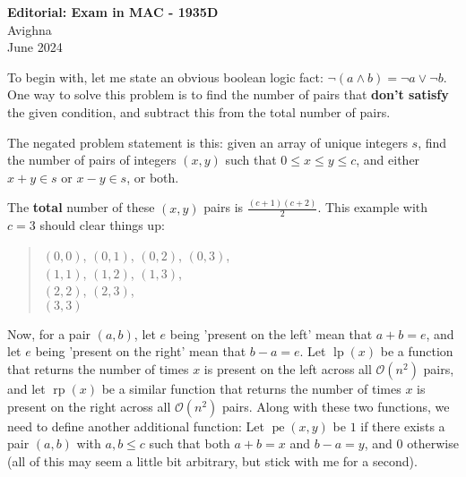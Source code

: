 \documentclass{article}
\begin{document}
\begin{center}
  \large{\textbf{Editorial: Exam in MAC - 1935D}}\\
  \vspace{0.2em}
  \large{Avighna}\\
  \vspace{0.2em}
  \large{June 2024}
\end{center}

To begin with, let me state an obvious boolean logic fact: $\neg (a \land b) = \neg a \lor \neg b$. One way to solve this problem is to find the number of pairs that \textbf{don't satisfy} the given condition, and subtract this from the total number of pairs.

The negated problem statement is this: given an array of unique integers $s$, find the number of pairs of integers $(x, y)$ such that $0 \le x \le y \le c$, and either $x+y \in s$ or $x-y \in s$, or both.

The \textbf{total} number of these $(x,y)$ pairs is $\frac{(c+1)(c+2)}{2}$. This example with $c=3$ should clear things up:\\
\begin{quote}
$(0, 0)$, $(0, 1)$, $(0, 2)$, $(0, 3)$,\\
$(1, 1)$, $(1, 2)$, $(1, 3)$,\\
$(2, 2)$, $(2, 3)$,\\
$(3, 3)$\\
\end{quote}

Now, for a pair $(a,b)$, let $e$ being 'present on the left' mean that $a+b=e$, and let $e$ being 'present on the right' mean that $b-a=e$. Let $\operatorname{lp}(x)$ be a function that returns the number of times $x$ is present on the left across all $\mathcal{O}(n^2)$ pairs, and let $\operatorname{rp}(x)$ be a similar function that returns the number of times $x$ is present on the right across all $\mathcal{O}(n^2)$ pairs. Along with these two functions, we need to define another additional function: Let $\operatorname{pe}(x,y)$ be $1$ if there exists a pair $(a,b)$ with $a, b \leq c$ such that both $a+b=x$ and $b-a=y$, and $0$ otherwise (all of this may seem a little bit arbitrary, but stick with me for a second).
\end{document}

